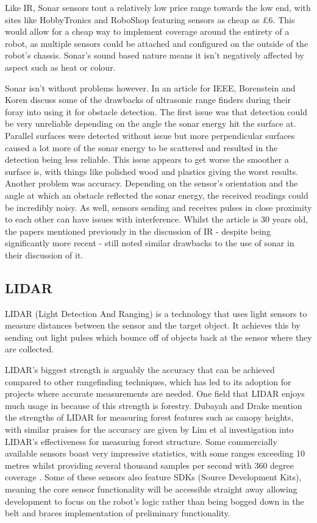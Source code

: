 				Like IR, Sonar sensors tout a relatively low price range towards the low end, with sites like HobbyTronics and RoboShop featuring sensors as cheap as \pounds{6}.  This would allow for a cheap way to implement coverage around the entirety of a robot, as multiple sensors could be attached and configured on the outside of the robot's chassis. Sonar's sound based nature means it isn't negatively affected by aspect such as heat or colour. 
				
				Sonar isn't without problems however. In an article for IEEE, Borenstein and Koren\citep{borenstein1988obstacle} discuss some of the drawbacks of ultrasonic range finders during their foray into using it for obstacle detection. The first issue was that detection could be very unreliable depending on the angle the sonar energy hit the surface at. Parallel surfaces were detected without issue but more perpendicular surfaces caused a lot more of the sonar energy to be scattered and resulted in the detection being less reliable. This issue appears to get worse the smoother a surface is, with things like polished wood and plastics giving the worst results. Another problem was accuracy. Depending on the sensor's orientation and the angle at which an obstacle reflected the sonar energy, the received readings could be incredibly noisy. As well, sensors sending and receives pulses in close proximity to each other can have issues with interference. Whilst the article is 30 years old, the papers mentioned previously in the discussion of IR - despite being significantly more recent - still noted similar drawbacks to the use of sonar in their discussion of it\citep{do2013infrared}\cite{lee2011low}.
				
				\subsection{LIDAR}
				\label{litreview:lidar}
				LIDAR (Light Detection And Ranging) is a technology that uses light sensors to measure distances between the sensor and the target object. It achieves this by sending out light pulses which bounce off of objects back at the sensor where they are collected.
				
				LIDAR's biggest strength is arguably the accuracy that can be achieved compared to other rangefinding techniques, which has led to its adoption for projects where accurate measurements are needed. One field that LIDAR enjoys much usage in because of this strength is forestry. Dubayah and Drake\citep{dubayah2000lidar} mention the strengths of LIDAR for measuring forest features such as canopy heights, with similar praises for the accuracy are given by Lim et al\citep{lim2003lidar} investigation into LIDAR's effectiveness for measuring forest structure. Some commercially available sensors boast very impressive statistics, with some ranges exceeding 10 metres whilst providing several thousand samples per second with 360 degree coverage \citep{slamtecA1M8}. Some of these sensors also feature SDKs (Source Development Kits), meaning the core sensor functionality will be accessible straight away allowing development to focus on the robot's logic rather than being bogged down in the belt and braces implementation of preliminary functionality. 
				

